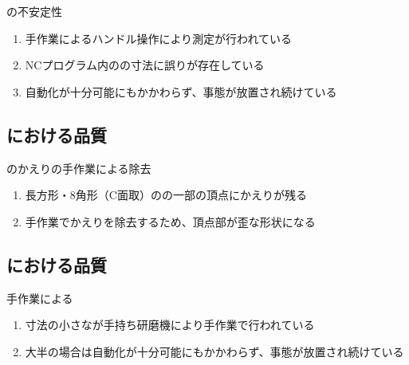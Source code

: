 \begin{Issues}{\CurvedOutcutMilling の不安定性}
\begin{enumerate}[label=\sarrow]
\item[{\sarrow[red]}]手作業によるハンドル操作により測定が行われている
\item[{\sarrow[red]}]NCプログラム内の\OutcutLength の寸法に誤りが存在している
\item[{\sarrow[red]}]自動化が十分可能にもかかわらず、事態が放置され続けている
\end{enumerate}
\end{Issues}


\clearpage
\subsection{\KeywayMilling における品質}

\begin{Issues}{\KeywayMilling のかえりの手作業による除去}
\begin{enumerate}[label=\sarrow]
\item[{\sarrow[red]}]長方形・8角形（C面取）の\KeywayMilling の一部の頂点にかえりが残る
\item[{\sarrow[red]}]手作業でかえりを除去するため、頂点部が歪な形状になる
\end{enumerate}
\end{Issues}


\subsection{\EndFaceChamferMilling における品質}

\begin{Issues}{手作業による\EndFaceChamferMilling}
\begin{enumerate}[label=\sarrow]
\item[{\sarrow[red]}]
寸法の小さな\EndFaceChamferMilling が手持ち研磨機により手作業で行われている
\item[{\sarrow[red]}]大半の場合は自動化が十分可能にもかかわらず、事態が放置され続けている
\end{enumerate}
\end{Issues}

